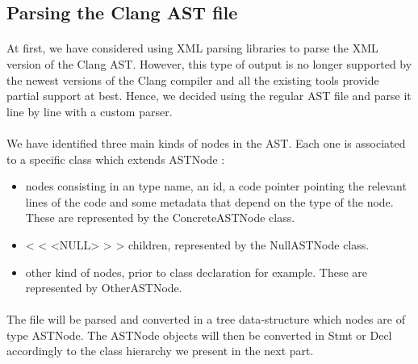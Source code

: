 \documentclass{report}
\begin{document}
\subsection{Parsing the Clang AST file}

\paragraph{}
\hspace{4mm}At first, we have considered using XML parsing libraries to parse the XML version of the Clang AST. However, 
this type of output is no longer supported by the newest versions of the Clang compiler and all the existing tools
provide partial support at best. Hence, we decided using the regular AST file and parse it line by line 
with a custom parser.

\paragraph{}
\hspace{4mm}We have identified three main kinds of nodes in the AST. Each one is associated to a specific class which extends ASTNode :

\vspace{1.5mm}
\begin{itemize}
\item nodes consisting in an type name, an id, a code pointer pointing the relevant lines of the code and some
metadata that depend on the type of the node. These are represented by the ConcreteASTNode class.\vspace{1mm}
\item < < <NULL> > > children, represented by the NullASTNode class.\vspace{1mm}
\item other kind of nodes, prior to class declaration for example. These are represented by OtherASTNode.\vspace{1mm}
\end{itemize}

\paragraph{}
\hspace{4mm}The file will be parsed and converted in a tree data-structure which nodes are of type ASTNode. The ASTNode objects
will then be converted in Stmt or Decl accordingly to the class hierarchy we present in the next part.
\end{document}
